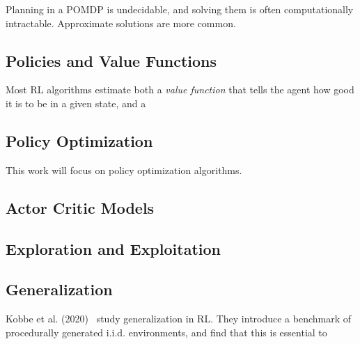 Planning in a POMDP is undecidable, and solving them is often computationally intractable. Approximate solutions are more common.


\subsection{Policies and Value Functions}

Most RL algorithms estimate both a \textit{value function} that tells the agent how good it is to be in a given state, and a 

\subsection{Policy Optimization}

This work will focus on policy optimization algorithms.

\subsection{Actor Critic Models}

\subsection{Exploration and Exploitation}

% 



\subsection{Generalization}




Kobbe et al. (2020)~\cite{} study generalization in RL. They introduce a benchmark of procedurally generated i.i.d. environments, and find that this is essential to 


